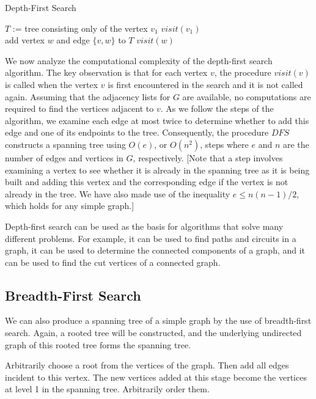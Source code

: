\documentclass{article}
\begin{document}
\begin{algorithm}
\caption{Depth-First Search}
\begin{algorithmic}
\State $T$ := tree consisting only of the vertex $v_1$
\State $visit(v_1)$
\EndProcedure
\\
\State add vertex $w$ and edge $\{v,w\}$ to $T$
\State $visit(w)$
\EndFor
\EndProcedure
\end{algorithmic}
\end{algorithm}

We now analyze the computational complexity of the depth-first search algorithm. The key observation is that for each vertex $v$, the procedure $visit(v)$ is called when the vertex $v$ is first encountered in the search and it is not called again. Assuming that the adjacency lists for $G$ are available, no computations are required to find the vertices adjacent to $v$. As we follow the steps of the algorithm, we examine each edge at most twice to determine whether to add this edge and one of its endpoints to the tree. Consequently, the procedure $DFS$ constructs a spanning tree using $O(e)$, or $O(n^2)$, steps where $e$ and $n$ are the number of edges and vertices in $G$, respectively. [Note that a step involves examining a vertex to see whether it is already in the spanning tree as it is being built and adding this vertex and the corresponding edge if the vertex is not already in the tree. We have also made use of the inequality $e \leq n(n - 1)/2$, which holds for any simple graph.] 

Depth-first search can be used as the basis for algorithms that solve many different problems. For example, it can be used to find paths and circuits in a graph, it can be used to determine the connected components of a graph, and it can be used to find the cut vertices of a connected graph. 

\subsection{Breadth-First Search}

We can also produce a spanning tree of a simple graph by the use of breadth-first search. Again, a rooted tree will be constructed, and the underlying undirected graph of this rooted tree forms the spanning tree. 

Arbitrarily choose a root from the vertices of the graph. Then add all edges incident to this vertex. The new vertices added at this stage become the vertices at level 1 in the spanning tree. Arbitrarily order them. 
\end{document}
